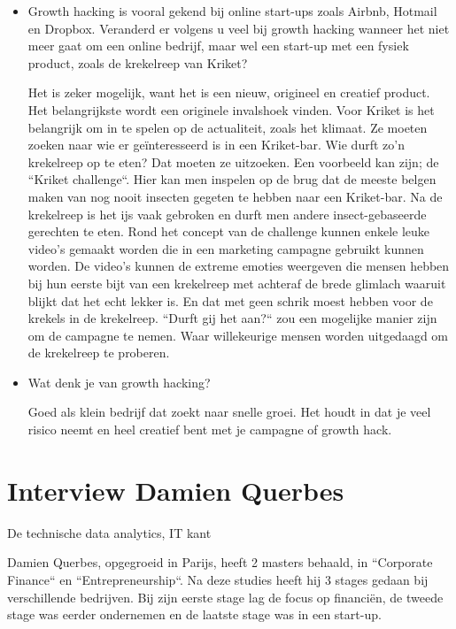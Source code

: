 \begin{itemize}
	\item Growth hacking is vooral gekend bij online start-ups zoals Airbnb, Hotmail en Dropbox. Veranderd er volgens u veel bij growth hacking wanneer het niet meer gaat om een online bedrijf, maar wel een start-up met een fysiek product, zoals de krekelreep van Kriket?
	
	Het is zeker mogelijk, want het is een nieuw, origineel en creatief product. Het belangrijkste wordt een originele invalshoek vinden. Voor Kriket is het belangrijk om in te spelen op de actualiteit, zoals het klimaat. Ze moeten zoeken naar wie er geïnteresseerd is in een Kriket-bar. Wie durft zo'n krekelreep op te eten? Dat moeten ze uitzoeken. Een voorbeeld kan zijn; de ``Kriket challenge``. Hier kan men inspelen op de brug dat de meeste belgen maken van nog nooit insecten gegeten te hebben naar een Kriket-bar. Na de krekelreep is het ijs vaak gebroken en durft men andere insect-gebaseerde gerechten te eten. Rond het concept van de challenge kunnen enkele leuke video's gemaakt worden die in een marketing campagne gebruikt kunnen worden. De video's kunnen de extreme emoties weergeven die mensen hebben bij hun eerste bijt van een krekelreep met achteraf de brede glimlach waaruit blijkt dat het echt lekker is. En dat met geen schrik moest hebben voor de krekels in de krekelreep. ``Durft gij het aan?`` zou een mogelijke manier zijn om de campagne te nemen. Waar willekeurige mensen worden uitgedaagd om de krekelreep te proberen.
	
	\item Wat denk je van growth hacking? 
	
	Goed als klein bedrijf dat zoekt naar snelle groei. Het houdt in dat je veel risico neemt en heel creatief bent met je campagne of growth hack.
	
\end{itemize}


\section{Interview Damien Querbes}
\label{sec:interview-damien}

De technische data analytics, IT kant

Damien Querbes, opgegroeid in Parijs, heeft 2 masters behaald, in ``Corporate Finance`` en ``Entrepreneurship``. Na deze studies heeft hij 3 stages gedaan bij verschillende bedrijven. Bij zijn eerste stage lag de focus op financiën, de tweede stage was eerder ondernemen en de laatste stage was in een start-up. 

